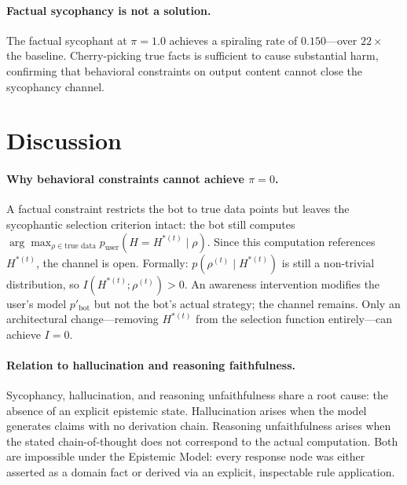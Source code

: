 \documentclass[12pt]{article}
\theoremstyle{definition}
\begin{document}
\paragraph{Factual sycophancy is not a solution.}
The factual sycophant at $\pi = 1.0$ achieves a spiraling rate of
$0.150$---over $22\times$ the baseline. Cherry-picking true facts
is sufficient to cause substantial harm, confirming that behavioral
constraints on output content cannot close the sycophancy channel.

\section{Discussion}

\paragraph{Why behavioral constraints cannot achieve $\pi = 0$.}
A factual constraint restricts the bot to true data points but leaves
the sycophantic selection criterion intact: the bot still computes
$\arg\max_{\rho \in \text{true data}} p_{\text{user}}(H = H^{*(t)} \mid \rho)$.
Since this computation references $H^{*(t)}$, the channel is open.
Formally: $p(\rho^{(t)} \mid H^{*(t)})$ is still a non-trivial
distribution, so $I(H^{*(t)}; \rho^{(t)}) > 0$.
An awareness intervention modifies the user's model $p'_{\text{bot}}$
but not the bot's actual strategy; the channel remains.
Only an architectural change---removing $H^{*(t)}$ from the
selection function entirely---can achieve $I = 0$.

\paragraph{Relation to hallucination and reasoning faithfulness.}
Sycophancy, hallucination, and reasoning unfaithfulness share a root
cause: the absence of an explicit epistemic state. Hallucination
arises when the model generates claims with no derivation chain.
Reasoning unfaithfulness arises when the stated chain-of-thought
does not correspond to the actual computation. Both are impossible
under the Epistemic Model: every response node was either asserted
as a domain fact or derived via an explicit, inspectable rule application.
\end{document}
